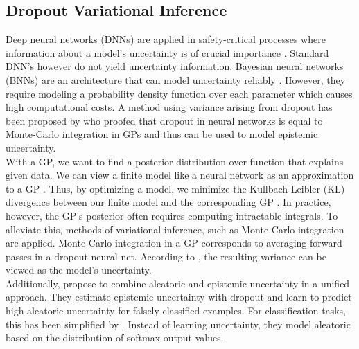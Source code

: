 \documentclass[a4paper,cleardoubleempty,BCOR1cm, 11pt]{report}
\begin{document}
\subsection{Dropout Variational Inference} %
Deep neural networks (DNNs) are applied in safety-critical processes where information about a model's uncertainty is of crucial importance \cite{najafabadi2015deep,krzywinski2013importance}. Standard DNN's however do not yield uncertainty information. Bayesian neural networks (BNNs) are an architecture that can model uncertainty reliably \cite{mullachery2018bayesian}. However, they require modeling a probability density function over each parameter which causes high computational costs. A method using variance arising from dropout has been proposed by \citet{gal2016dropout} who proofed that dropout in neural networks is equal to Monte-Carlo integration in GPs and thus can be used to model epistemic uncertainty.\\
With a GP, we want to find a posterior distribution over function that explains given data. We can view a finite model like a neural network as an approximation to a GP \cite{damianou2013deep}. Thus, by optimizing a model, we minimize the Kullbach-Leibler (KL) divergence between our finite model and the corresponding GP \cite{gal2016dropout}. In practice, however, the GP's posterior often requires computing intractable integrals. To alleviate this, methods of variational inference, such as Monte-Carlo integration are applied. Monte-Carlo integration in a GP corresponds to averaging forward passes in a dropout neural net. According to \citet{gal2016dropout}, the resulting variance can be viewed as the model's uncertainty.
\\
Additionally, \citet{kendall2017uncertainties} propose to combine aleatoric and epistemic uncertainty in a unified approach. They estimate epistemic uncertainty with dropout and learn to predict high aleatoric uncertainty for falsely classified examples.
For classification tasks, this has been simplified by \citet{kwon2020uncertainty}. Instead of learning uncertainty, they model aleatoric based on the distribution of softmax output values.
\end{document}
